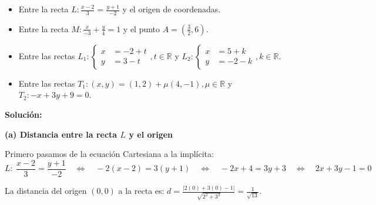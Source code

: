 \documentclass[11pt]{article}
\begin{document}
\begin{enumerate}[\hspace{-5mm} 1) ]
\begin{itemize}
    \item[(a)] Entre la recta $L : \frac{x - 2}{3} = \frac{y + 1}{-2}$ y el origen de coordenadas.
    \item[(b)] Entre la recta $M : \frac{x}{-3} + \frac{y}{4} = 1$ y el punto $A = \left(\frac{3}{2}, 6\right)$.
    \item[(c)] Entre las rectas $L_1 : \begin{cases} x &= -2 + t \\ y &= 3 - t \end{cases}, t \in \mathbb{R}$ y $L_2 : \begin{cases} x &= 5 + k \\ y &= -2 - k \end{cases}, k \in \mathbb{R}$.
    \item[(d)] Entre las rectas $T_1 : (x, y) = (1, 2) + \mu(4, -1), \mu \in \mathbb{R}$ y $T_2 : -x + 3y + 9 = 0$.
\end{itemize}





\textbf{Solución:}

\textbf{(a) Distancia entre la recta $L$ y el origen}

Primero pasamos de la ecuación  Cartesiana a la implícita: 
\[
    L:\  \frac{x - 2}{3} =  \frac{y + 1}{-2}
\quad
\Longleftrightarrow
\quad 
    -2(x - 2) = 3(y + 1)
\quad
\Longleftrightarrow
\quad
-2x + 4 = 3y + 3
\quad
\Longleftrightarrow
\quad
    2x + 3y - 1 = 0
\]

La distancia del origen $(0,0)$ a la recta es: \quad $ \displaystyle  d = \frac{|2(0) + 3(0) - 1|}{\sqrt{2^2 + 3^2}} = \frac{1}{\sqrt{13}}$. 



\begin{center}
\end{center}
\end{enumerate}
\end{document}
